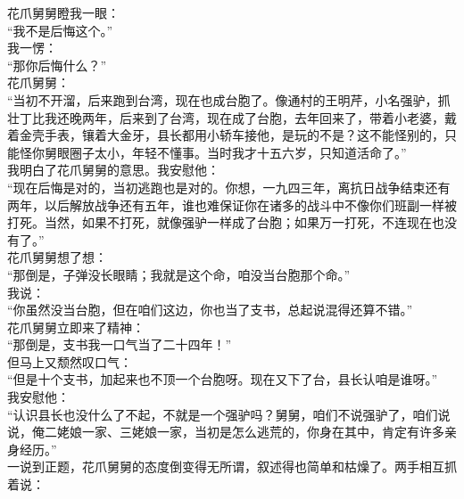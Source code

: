 花爪舅舅瞪我一眼：\\

“我不是后悔这个。”\\

我一愣：\\

“那你后悔什么？”\\

花爪舅舅：\\

“当初不开溜，后来跑到台湾，现在也成台胞了。像通村的王明芹，小名强驴，抓壮丁比我还晚两年，后来到了台湾，现在成了台胞，去年回来了，带着小老婆，戴着金壳手表，镶着大金牙，县长都用小轿车接他，是玩的不是？这不能怪别的，只能怪你舅眼圈子太小，年轻不懂事。当时我才十五六岁，只知道活命了。”\\

我明白了花爪舅舅的意思。我安慰他：\\

“现在后悔是对的，当初逃跑也是对的。你想，一九四三年，离抗日战争结束还有两年，以后解放战争还有五年，谁也难保证你在诸多的战斗中不像你们班副一样被打死。当然，如果不打死，就像强驴一样成了台胞；如果万一打死，不连现在也没有了。”\\

花爪舅舅想了想：\\

“那倒是，子弹没长眼睛；我就是这个命，咱没当台胞那个命。”\\

我说：\\

“你虽然没当台胞，但在咱们这边，你也当了支书，总起说混得还算不错。”\\

花爪舅舅立即来了精神：\\

“那倒是，支书我一口气当了二十四年！”\\

但马上又颓然叹口气：\\

“但是十个支书，加起来也不顶一个台胞呀。现在又下了台，县长认咱是谁呀。”\\

我安慰他：\\

“认识县长也没什么了不起，不就是一个强驴吗？舅舅，咱们不说强驴了，咱们说说，俺二姥娘一家、三姥娘一家，当初是怎么逃荒的，你身在其中，肯定有许多亲身经历。”\\

一说到正题，花爪舅舅的态度倒变得无所谓，叙述得也简单和枯燥了。两手相互抓着说：\\


